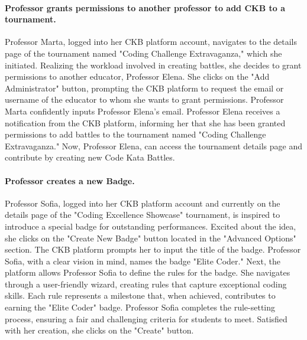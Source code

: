 \paragraph*{Professor grants permissions to another professor to add CKB to a tournament.}
Professor Marta, logged into her CKB platform account, navigates to the details page of the tournament named "Coding Challenge Extravaganza," which she initiated. 
Realizing the workload involved in creating battles, she decides to grant permissions to another educator, Professor Elena.
She clicks on the "Add Administrator" button, prompting the CKB platform to request the email or username of the educator to whom she wants to grant permissions. 
Professor Marta confidently inputs Professor Elena's email.
Professor Elena receives a notification from the CKB platform, informing her that she has been granted permissions to add battles to the tournament named "Coding Challenge Extravaganza."
Now, Professor Elena, can access the tournament details page and contribute by creating new Code Kata Battles. 

\paragraph*{Professor creates a new Badge.}
Professor Sofia, logged into her CKB platform account and currently on the details page of the "Coding Excellence Showcase" tournament, is inspired to introduce a special badge for outstanding performances. 
Excited about the idea, she clicks on the "Create New Badge" button located in the "Advanced Options" section.
The CKB platform prompts her to input the title of the badge. 
Professor Sofia, with a clear vision in mind, names the badge "Elite Coder."
Next, the platform allows Professor Sofia to define the rules for the badge. 
She navigates through a user-friendly wizard, creating rules that capture exceptional coding skills. 
Each rule represents a milestone that, when achieved, contributes to earning the "Elite Coder" badge.
Professor Sofia completes the rule-setting process, ensuring a fair and challenging criteria for students to meet. 
Satisfied with her creation, she clicks on the "Create" button.

